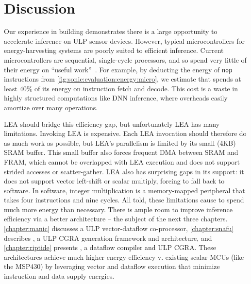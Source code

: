 \section{Discussion}
\label{sonic:discuss}
Our experience in building \sonictails demonstrates there is a large
opportunity to accelerate inference on ULP sensor devices.
% 
However, typical microcontrollers for energy-harvesting systems are poorly
suited to efficient inference.
% 
Current microcontrollers are sequential, single-cycle processors,
and so spend very little of their energy on ``useful work''~\cite{horowitz:isscc14:energy-keynote}.
%
For example, by deducting the energy of \texttt{nop} instructions from \autoref{fig:sonic:evaluation:energy:micro},
we estimate that \sonic spends at least 40\% of its energy on instruction fetch and decode.
%
This cost is a waste in highly structured computations like DNN inference,
where overheads easily amortize over many operations. %

LEA should bridge this efficiency gap, but unfortunately LEA has many limitations.
%
Invoking LEA is expensive. Each LEA invocation should therefore do as much work as
possible, but LEA's parallelism is limited by its small (4KB) SRAM buffer.
%
This small buffer also forces frequent DMA between SRAM and FRAM,
which cannot be overlapped with LEA execution
and does not support strided accesses or scatter-gather.
%
LEA also has surprising gaps in its support:
it does not support vector left-shift or scalar multiply,
forcing \tails to fall back to software.
%
In software, integer multiplication is a memory-mapped peripheral that takes
four instructions and nine cycles.
%
All told, these limitations cause \sonictails to spend much more energy than necessary.
% 
There is ample room to improve inference efficiency via a better architecture -- the subject of the next three chapters.
% 
\autoref{chapter:manic} discusses \manic a ULP vector-dataflow co-processor, \autoref{chapter:snafu} describes \snafu, a ULP CGRA generation framework and architecture, and \autoref{chapter:riptide} presents \riptide, a dataflow compiler and ULP CGRA.
% 
These architectures achieve much higher energy-efficiency v. existing scalar MCUs (like the MSP430) by leveraging vector and dataflow execution that minimize instruction and data supply energies.

